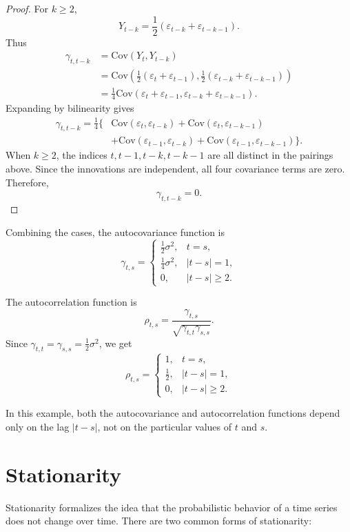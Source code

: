 \documentclass[12pt,oneside]{book}
\numberwithin{equation}{section}
\theoremstyle{definition}
\theoremstyle{plain}
\theoremstyle{remark}
\newcommand{\Cov}{\mathrm{Cov}}
\begin{document}
\begin{proof}
For $k\geq 2$,
\[
Y_{t-k}
=
\frac{1}{2}(\varepsilon_{t-k}+\varepsilon_{t-k-1}).
\]
Thus
\begin{align*}
\gamma_{t,t-k}
&=
\Cov(Y_t,Y_{t-k}) \\
&=
\Cov\left(
\frac{1}{2}(\varepsilon_t+\varepsilon_{t-1}),
\frac{1}{2}(\varepsilon_{t-k}+\varepsilon_{t-k-1})
\right) \\
&=
\frac{1}{4}
\Cov(\varepsilon_t+\varepsilon_{t-1},
\varepsilon_{t-k}+\varepsilon_{t-k-1}).
\end{align*}
Expanding by bilinearity gives
\begin{align*}
\gamma_{t,t-k}
=
\frac{1}{4}\{
&\Cov(\varepsilon_t,\varepsilon_{t-k})
+
\Cov(\varepsilon_t,\varepsilon_{t-k-1}) \\
&+
\Cov(\varepsilon_{t-1},\varepsilon_{t-k})
+
\Cov(\varepsilon_{t-1},\varepsilon_{t-k-1})
\}.
\end{align*}
When $k\geq 2$, the indices $t,t-1,t-k,t-k-1$ are all distinct in the pairings above. Since the innovations are independent, all four covariance terms are zero. Therefore,
\[
\gamma_{t,t-k}=0.
\]
\end{proof}

Combining the cases, the autocovariance function is
\[
\gamma_{t,s}
=
\begin{cases}
\frac{1}{2}\sigma^2, & t=s,\\
\frac{1}{4}\sigma^2, & |t-s|=1,\\
0, & |t-s|\geq 2.
\end{cases}
\]

The autocorrelation function is
\[
\rho_{t,s}
=
\frac{\gamma_{t,s}}{\sqrt{\gamma_{t,t}\gamma_{s,s}}}.
\]
Since $\gamma_{t,t}=\gamma_{s,s}=\frac{1}{2}\sigma^2$, we get
\[
\rho_{t,s}
=
\begin{cases}
1, & t=s,\\
\frac{1}{2}, & |t-s|=1,\\
0, & |t-s|\geq 2.
\end{cases}
\]

In this example, both the autocovariance and autocorrelation functions depend only on the lag $|t-s|$, not on the particular values of $t$ and $s$.

\section*{Stationarity}

Stationarity formalizes the idea that the probabilistic behavior of a time series does not change over time. There are two common forms of stationarity:
\end{document}
